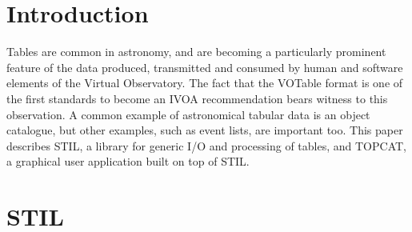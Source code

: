 \documentclass[11pt,twoside]{article}  %
\begin{document}
%
%

\section{Introduction}

Tables are common in astronomy, and are becoming a particularly
prominent feature of the data produced, transmitted and consumed by
human and software elements of the Virtual Observatory.
The fact that the VOTable format is one of the first standards to become
an IVOA recommendation bears witness to this observation.
A common example of astronomical tabular data is an object catalogue, 
but other examples, such as event lists, are important too.
This paper describes STIL, a library for generic I/O and processing of
tables, and TOPCAT, a graphical user application built on top of STIL.

\section{STIL}
\end{document}
